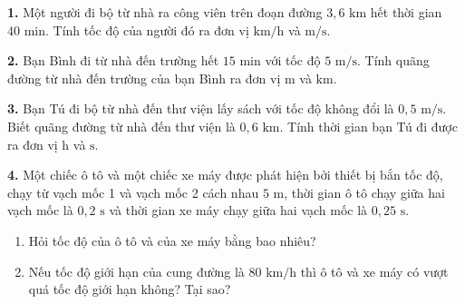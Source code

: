 \documentclass[11pt,a4paper]{article}
\begin{document}
\textbf{1.} Một người đi bộ từ nhà ra công viên trên đoạn đường $3{,}6\text{ km}$ hết thời gian $40\text{ min}$. Tính tốc độ của người đó ra đơn vị $\text{km/h}$ và $\text{m/s}$.
\par\vspace{1pt}\noindent\dotfill\par\vspace{3pt}\noindent\dotfill\par\vspace{3pt}\noindent\dotfill\par\vspace{3pt}\noindent\dotfill\par\vspace{3pt}\noindent
\textbf{2.} Bạn Bình đi từ nhà đến trường hết $15\text{ min}$ với tốc độ $5\text{ m/s}$. Tính quãng đường từ nhà đến trường của bạn Bình ra đơn vị $\text{m}$ và $\text{km}$.
\par\vspace{1pt}\noindent\dotfill\par\vspace{3pt}\noindent\dotfill\par\vspace{3pt}\noindent\dotfill\par\vspace{3pt}\noindent\dotfill\par\vspace{3pt}\noindent
\textbf{3.} Bạn Tú đi bộ từ nhà đến thư viện lấy sách với tốc độ không đổi là $0{,}5\text{ m/s}$. Biết quãng đường từ nhà đến thư viện là $0{,}6\text{ km}$. Tính thời gian bạn Tú đi được ra đơn vị $\text{h}$ và $\text{s}$.
\par\vspace{1pt}\noindent\dotfill\par\vspace{3pt}\noindent\dotfill\par\vspace{3pt}\noindent\dotfill\par\vspace{3pt}\noindent\dotfill\par\vspace{3pt}\noindent
\textbf{4.} Một chiếc ô tô và một chiếc xe máy được phát hiện bởi thiết bị bắn tốc độ, chạy từ vạch mốc 1 và vạch mốc 2 cách nhau $5\text{ m}$, thời gian ô tô chạy giữa hai vạch mốc là $0{,}2\text{ s}$ và thời gian xe máy chạy giữa hai vạch mốc là $0{,}25\text{ s}$.
\begin{enumerate}[label=\alph*.,leftmargin=1.5cm,itemsep=1pt]
  \item Hỏi tốc độ của ô tô và của xe máy bằng bao nhiêu?
  \item Nếu tốc độ giới hạn của cung đường là $80\text{ km/h}$ thì ô tô và xe máy có vượt quá tốc độ giới hạn không? Tại sao?
\end{enumerate}
\end{document}
